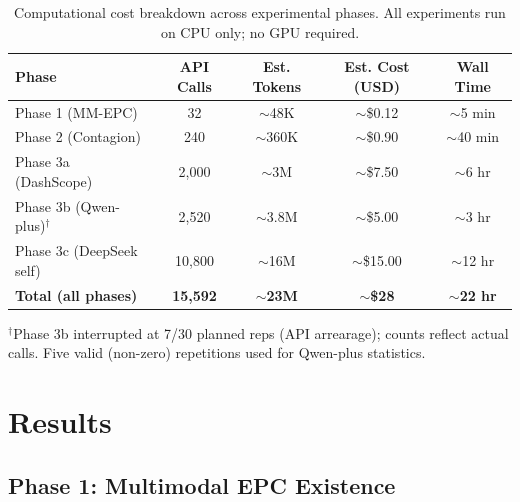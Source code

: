 \documentclass[11pt,a4paper]{article}
\begin{document}
\begin{table}[H]
\centering
\caption{Computational cost breakdown across experimental phases. All experiments run on CPU only; no GPU required.}
\label{tab:cost}
\begin{tabular}{lcccc}
\toprule
\textbf{Phase} & \textbf{API Calls} & \textbf{Est. Tokens} & \textbf{Est. Cost (USD)} & \textbf{Wall Time} \\
\midrule
Phase 1 (MM-EPC)        & 32    & $\sim$48K   & $\sim$\$0.12  & $\sim$5 min \\
Phase 2 (Contagion)     & 240   & $\sim$360K  & $\sim$\$0.90  & $\sim$40 min \\
Phase 3a (DashScope)    & 2,000 & $\sim$3M    & $\sim$\$7.50  & $\sim$6 hr \\
Phase 3b (Qwen-plus)$^\dagger$ & 2,520 & $\sim$3.8M & $\sim$\$5.00 & $\sim$3 hr \\
Phase 3c (DeepSeek self) & 10,800 & $\sim$16M  & $\sim$\$15.00 & $\sim$12 hr \\
\midrule
\textbf{Total (all phases)} & \textbf{15,592} & $\sim$\textbf{23M} & $\sim$\textbf{\$28} & $\sim$\textbf{22 hr} \\
\bottomrule
\end{tabular}

\vspace{4pt}
\begin{minipage}{\textwidth}
\footnotesize
$^\dagger$Phase 3b interrupted at 7/30 planned reps (API arrearage); counts reflect actual calls. Five valid (non-zero) repetitions used for Qwen-plus statistics.
\end{minipage}
\end{table}

\section{Results}

\subsection{Phase 1: Multimodal EPC Existence}
\end{document}
